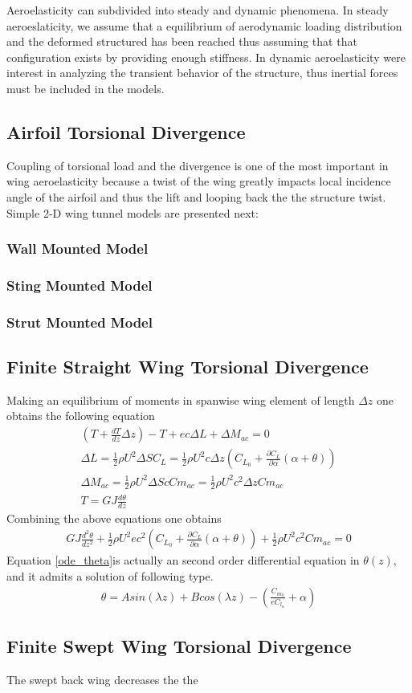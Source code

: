 Aeroelasticity can subdivided into steady and dynamic phenomena. In steady
aeroeslaticity, we assume that a equilibrium of aerodynamic loading distribution and the deformed structured has been reached thus assuming that that configuration exists by providing enough stiffness.
In dynamic aeroelasticity were interest in analyzing the transient behavior of the structure, thus inertial forces must be included in the models.

\subsection{Airfoil Torsional Divergence}
Coupling of torsional load and the divergence is one of the most important in wing aeroelasticity because a twist of the wing greatly impacts local incidence angle of the airfoil
and thus the lift and looping back the the structure twist.
Simple 2-D wing tunnel models are presented next:

\subsubsection{Wall Mounted Model}

\subsubsection{Sting Mounted Model}

\subsubsection{Strut Mounted Model}

\subsection{Finite Straight Wing Torsional Divergence}
Making an equilibrium of moments in spanwise wing element of length $\Delta z$ one obtains the following equation
\begin{align}
\left( T+\frac{d T}{d z}\Delta z \right)-T +ec\Delta L + \Delta M_{ac}=0\\
\Delta L= \frac{1}{2} \rho U^2 \Delta S C_L = \frac{1}{2} \rho U^2 c \Delta z \left( C_{L_0} + \frac{\partial C_L}{\partial \alpha}(\alpha + \theta) \right)\\
\Delta M_{ac}= \frac{1}{2} \rho U^2 \Delta S c Cm_{ac} = \frac{1}{2} \rho U^2 c^2 \Delta z Cm_{ac}\\
T=GJ \frac{d \theta}{dz}
\end{align}
Combining the above equations one obtains
\begin{align}
GJ\frac{d^2 \theta}{dz^2} + \frac{1}{2} \rho U^2 ec^2 \left( C_{L_0} + \frac{\partial C_L}{\partial \alpha}(\alpha + \theta) \right) + \frac{1}{2} \rho U^2 c^2 Cm_{ac}=0 \label{ode_theta}
\end{align}
Equation \eqref{ode_theta}is actually an second order differential equation in $\theta(z)$, and it admits a solution of following type.
\begin{align}
\theta= A sin(\lambda z) + B cos(\lambda z) - \left(\frac{C_{m_0}}{e C_{l_\alpha}} + \alpha \right)
\end{align}




\subsection{Finite Swept Wing Torsional Divergence}
The swept back wing decreases the the
